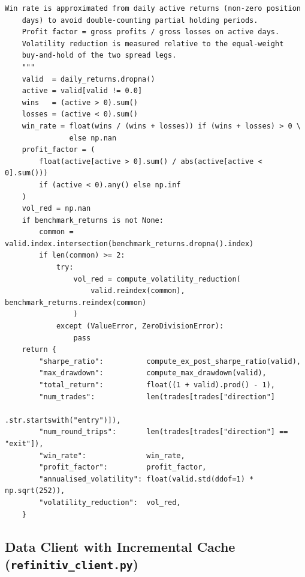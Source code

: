 \documentclass[a4paper]{report}
\begin{document}
\begin{Verbatim}[fontsize=\footnotesize, baselinestretch=0.85]
    Win rate is approximated from daily active returns (non-zero position
    days) to avoid double-counting partial holding periods.
    Profit factor = gross profits / gross losses on active days.
    Volatility reduction is measured relative to the equal-weight
    buy-and-hold of the two spread legs.
    """
    valid  = daily_returns.dropna()
    active = valid[valid != 0.0]
    wins   = (active > 0).sum()
    losses = (active < 0).sum()
    win_rate = float(wins / (wins + losses)) if (wins + losses) > 0 \
               else np.nan
    profit_factor = (
        float(active[active > 0].sum() / abs(active[active < 0].sum()))
        if (active < 0).any() else np.inf
    )
    vol_red = np.nan
    if benchmark_returns is not None:
        common = valid.index.intersection(benchmark_returns.dropna().index)
        if len(common) >= 2:
            try:
                vol_red = compute_volatility_reduction(
                    valid.reindex(common), benchmark_returns.reindex(common)
                )
            except (ValueError, ZeroDivisionError):
                pass
    return {
        "sharpe_ratio":          compute_ex_post_sharpe_ratio(valid),
        "max_drawdown":          compute_max_drawdown(valid),
        "total_return":          float((1 + valid).prod() - 1),
        "num_trades":            len(trades[trades["direction"]
                                             .str.startswith("entry")]),
        "num_round_trips":       len(trades[trades["direction"] == "exit"]),
        "win_rate":              win_rate,
        "profit_factor":         profit_factor,
        "annualised_volatility": float(valid.std(ddof=1) * np.sqrt(252)),
        "volatility_reduction":  vol_red,
    }
\end{Verbatim}

\subsection{Data Client with Incremental Cache (\texttt{refinitiv\_client.py})}
\end{document}
